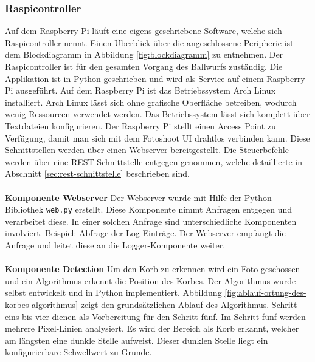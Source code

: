 \subsubsection{Raspicontroller}
Auf dem Raspberry Pi läuft eine eigens geschriebene Software, welche sich Raspicontroller nennt. Einen Überblick über die angeschlossene Peripherie ist dem Blockdiagramm in Abbildung \ref{fig:blockdiagramm} zu entnehmen. Der Raspicontroller ist für den gesamten Vorgang des Ballwurfs zuständig. Die Applikation ist in Python geschrieben und wird als Service auf einem Raspberry Pi ausgeführt. Auf dem Raspberry Pi ist das Betriebssystem Arch Linux installiert. Arch Linux lässt sich ohne grafische Oberfläche betreiben, wodurch wenig Ressourcen verwendet werden. Das Betriebssystem lässt sich komplett über Textdateien konfigurieren. Der Raspberry Pi stellt einen Access Point zu Verfügung, damit man sich mit dem Fotoshoot UI drahtlos verbinden kann. Diese Schnittstellen werden über einen Webserver bereitgestellt. Die Steuerbefehle werden über eine REST-Schnittstelle entgegen genommen, welche detaillierte in Abschnitt \ref{sec:rest-schnittstelle} beschrieben sind. 
\\
\\
\textbf{Komponente Webserver}
Der Webserver wurde mit Hilfe der Python-Bibliothek \texttt{web.py} erstellt. Diese Komponente nimmt Anfragen entgegen und verarbeitet diese. In einer solchen Anfrage sind unterschiedliche Komponenten involviert. Beispiel: Abfrage der Log-Einträge. Der Webserver empfängt die Anfrage und leitet diese an die Logger-Komponente weiter.
\\
\\
\textbf{Komponente Detection}
Um den Korb zu erkennen wird ein Foto geschossen und ein Algorithmus erkennt die Position des Korbes. Der Algorithmus wurde selbst entwickelt und in Python implementiert. Abbildung \ref{fig:ablauf-ortung-des-korbes-algorithmus} zeigt den grundsätzlichen Ablauf des Algorithmus. Schritt eins bis vier dienen als Vorbereitung für den Schritt fünf. Im Schritt fünf werden mehrere Pixel-Linien analysiert. Es wird der Bereich als Korb erkannt, welcher am längsten eine dunkle Stelle aufweist. Dieser dunklen Stelle liegt ein konfigurierbare Schwellwert zu Grunde.

